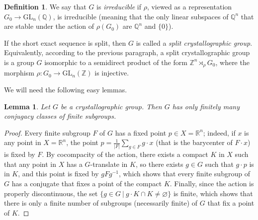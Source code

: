 \documentclass[a4paper, 11pt]{amsart}
\newtheorem{lemme}[te]{Lemma}
\theoremstyle{definition}
\newtheorem{de}[te]{Definition}
\theoremstyle{remark}
\begin{document}
\begin{de}\label{def_irreducible}We say that $G$ is \emph{irreducible} if $\rho$, viewed as a representation $G_0\rightarrow\mathrm{GL}_n(\mathbb{Q})$, is irreducible (meaning that the only linear subspaces of $\mathbb{Q}^n$ that are stable under the action of $\rho(G_0)$ are $\mathbb{Q}^n$ and $\lbrace 0\rbrace$).\end{de}





If the short exact sequence is split, then $G$ is called a \emph{split crystallographic group}. Equivalently, according to the previous paragraph, a split crystallographic group is a group $G$ isomorphic to a semidirect product of the form $\mathbb{Z}^n \rtimes_{\rho} G_0$, where the morphism $\rho:G_0 \rightarrow \mathrm{GL}_n(\mathbb{Z})$ is injective. 

We will need the following easy lemmas.

\begin{lemme}\label{finitely_many}
Let $G$ be a crystallographic group. Then $G$ has only finitely many conjugacy classes of finite subgroups.
\end{lemme}

\begin{proof}
Every finite subgroup $F$ of $G$ has a fixed point $p\in X=\mathbb{R}^n$; indeed, if $x$ is any point in $X=\mathbb{R}^n$, the point $p=\frac{1}{\vert F\vert}\sum_{g\in F}g\cdot x$ (that is the barycenter of $F\cdot x$) is fixed by $F$. By cocompacity of the action, there exists a compact $K$ in $X$ such that any point in $X$ has a $G$-translate in $K$, so there exists $g\in G$ such that $g\cdot p$ is in $K$, and this point is fixed by $gFg^{-1}$, which shows that every finite subgroup of $G$ has a conjugate that fixes a point of the compact $K$. Finally, since the action is properly discontinuous, the set $\lbrace g\in G \ \vert \ g\cdot K \cap K \neq \varnothing \rbrace$ is finite, which shows that there is only a finite number of subgroups (necessarily finite) of $G$ that fix a point of $K$.\end{proof}
\end{document}
